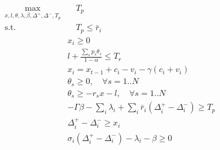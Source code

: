 \documentclass{article}
\begin{document}
\begin{equation}
  \begin{aligned}
  \max_{x, l, \theta, \lambda, \beta, \Delta^+, \Delta^-, T_p} &\quad T_p\\
  \textrm{s.t.} & \quad T_p \leq \bar{r}_i\\
    & x_i \geq 0 \quad \\
    & l + \frac{\sum_s p_s \theta_s}{1-\alpha} \leq T_r\\
    & x_i = x_{t-1} + c_i - v_i - \gamma(c_i + v_i)\\
    & \theta_s \geq 0, \quad \forall s=1..N\\
    & \theta_s \geq -r_sx - l, \quad \forall s=1..N\\
    &-\Gamma \beta - \sum_i \lambda_i + \sum_i \bar{r}_i(\Delta_i^+ - \Delta_i^-) \geq T_p\\
    & \Delta_i^+ - \Delta_i^- \geq x_i\\
    & \sigma_i(\Delta_i^+ - \Delta_i^-) - \lambda_i - \beta \geq 0\\
  \end{aligned}
\end{equation}
\end{document}
